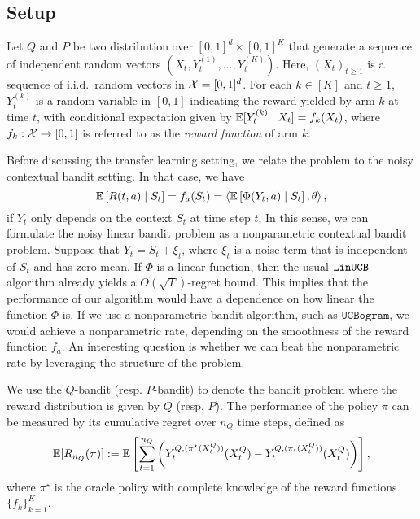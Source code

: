 \subsection{Setup}

Let $Q$ and $P$ be two distribution over $[0,1]^d \times [0,1]^K$ that generate a sequence of independent random vectors $(X_t, Y_t^{(1)}, \ldots, Y_t^{(K)})$. 
Here, $(X_t)_{t\geq 1}$ is a sequence of i.i.d.~random vectors in $\mathcal{X} = [0,1]^d$. 
For each $k \in [K]$ and $t \geq 1$, $Y_t^{(k)}$ is a random variable in $[0,1]$ indicating the reward yielded by arm $k$ at time $t$, with conditional expectation given by $\mathbb{E}[Y_t^{(k)} \mid X_t] = f_k(X_t)$, where $f_k : \mathcal{X} \to [0,1]$ is referred to as the \emph{reward function} of arm $k$.

Before discussing the transfer learning setting, we relate the problem to the noisy contextual bandit setting.
In that case, we have 
\begin{equation*}
    \mathbb{E} \left[R(t,a) \mid S_t\right] = f_a(S_t) = \left\langle \mathbb{E} \left[ \Phi(Y_t, a) \mid S_t \right], \theta\right\rangle ,
\end{equation*}
if $Y_t$ only depends on the context $S_t$ at time step $t$.
In this sense, we can formulate the noisy linear bandit problem as a nonparametric contextual bandit problem. 
Suppose that $Y_t = S_t + \xi_t$, where $\xi_t$ is a noise term that is independent of $S_t$ and has zero mean. 
If $\Phi$ is a linear function, then the usual $\texttt{LinUCB}$ algorithm already yields a $O(\sqrt{T})$-regret bound. 
This implies that the performance of our algorithm would have a dependence on how linear the function $\Phi$ is.
If we use a nonparametric bandit algorithm, such as $\texttt{UCBogram}$, we would achieve a nonparametric rate, depending on the smoothness of the reward function $f_a$.
An interesting question is whether we can beat the nonparametric rate by leveraging the structure of the problem.  

We use the $Q$-bandit (resp. $P$-bandit) to denote the bandit problem where the reward distribution is given by $Q$ (resp. $P$).
The performance of the policy $\pi$ can be measured by its cumulative regret over $n_Q$ time steps, defined as
\begin{equation*}
    \mathbb{E} [R_{n_Q}(\pi)] := \mathbb{E} \left[ \sum_{t=1}^{n_Q} \left( Y_t^{Q,(\pi^\star(X_t^Q))}(X_t^Q) - Y_t^{Q,(\pi_t(X_t^Q))}(X_t^Q) \right) \right],
\end{equation*}
where $\pi^\star$ is the oracle policy with complete knowledge of the reward functions $\{f_k\}_{k=1}^K$. 